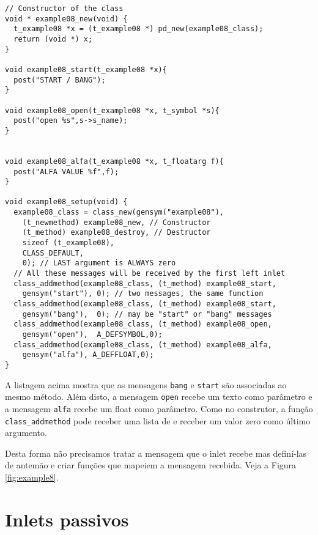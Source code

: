\begin{lstlisting}[caption=Passagem de mensagens para o primeiro inlet]
// Constructor of the class
void * example08_new(void) {
  t_example08 *x = (t_example08 *) pd_new(example08_class);
  return (void *) x;
}

void example08_start(t_example08 *x){
  post("START / BANG");
}

void example08_open(t_example08 *x, t_symbol *s){
  post("open %s",s->s_name);
}


void example08_alfa(t_example08 *x, t_floatarg f){
  post("ALFA VALUE %f",f);
}

void example08_setup(void) {
  example08_class = class_new(gensym("example08"),
    (t_newmethod) example08_new, // Constructor
    (t_method) example08_destroy, // Destructor
    sizeof (t_example08),
    CLASS_DEFAULT,
    0); // LAST argument is ALWAYS zero
  // All these messages will be received by the first left inlet
  class_addmethod(example08_class, (t_method) example08_start, 
    gensym("start"), 0); // two messages, the same function
  class_addmethod(example08_class, (t_method) example08_start, 
    gensym("bang"),  0); // may be "start" or "bang" messages
  class_addmethod(example08_class, (t_method) example08_open,  
    gensym("open"),  A_DEFSYMBOL,0);
  class_addmethod(example08_class, (t_method) example08_alfa,  
    gensym("alfa"), A_DEFFLOAT,0); 
}
\end{lstlisting}

A listagem acima mostra que as mensagens \texttt{bang} e \texttt{start} são
associadas ao mesmo método.
Além disto, a mensagem \texttt{open} recebe um texto como parâmetro e a mensagem
\texttt{alfa} recebe um float como parâmetro.
Como no construtor, a função \texttt{class\_addmethod} pode receber uma lista de
e receber um valor zero como último argumento.

Desta forma não precisamos tratar a mensagem que o inlet recebe mas definí-las
de antemão e criar funções que mapeiem a mensagem recebida.
Veja a Figura \ref{fig:example8}.


\section{Inlets passivos}

